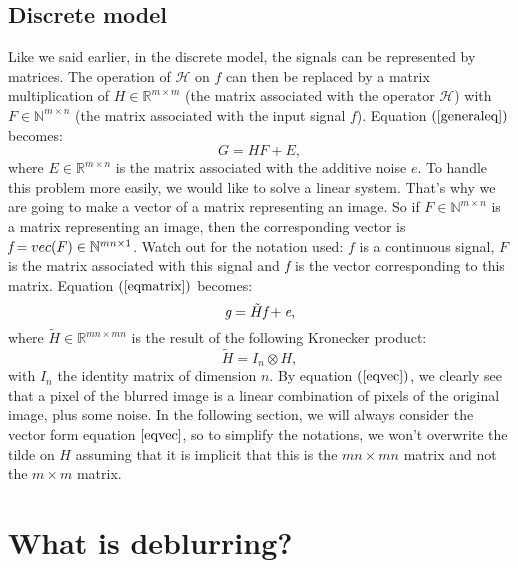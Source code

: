\subsection{Discrete model}

Like we said earlier, in the discrete model, the signals can be represented by matrices. The operation of $\mathcal{H}$ on $f$ can then be replaced by a matrix multiplication of $H \in \mathbb{R}^{m \times m}$ (the matrix associated with the operator $\mathcal{H}$) with $F \in \mathbb{N}^{m \times n}$ (the matrix associated with the input signal $f$). Equation $(\ref{generaleq})$ becomes:
\begin{equation}
G = HF + E,
\label{eqmatrix}
\end{equation}
where $E \in \mathbb{R}^{m \times n}$ is the matrix associated with the additive noise $e$. To handle this problem more easily, we would like to solve a linear system. That's why we are going to make a vector of a matrix representing an image. So if $F \in \mathbb{N}^{m \times n}$ is a matrix representing an image, then the corresponding vector is $\emph{f} = vec(F) \in \mathbb{N}^{mn \times 1}$. Watch out for the notation used: $f$ is a continuous signal, $F$ is the matrix associated with this signal and $\emph{f}$  is the vector corresponding to this matrix. Equation $(\ref{eqmatrix})$ becomes:
\begin{equation}
\emph{g} = \tilde{H}\emph{f} + \emph{e},
\label{eqvec}
\end{equation}
where $\tilde{H} \in \mathbb{R}^{mn \times mn}$ is the result of the following Kronecker product:
\begin{equation}
\tilde{H} = I_n \otimes H,
\end{equation}
with $I_n$ the identity matrix of dimension $n$. By equation $(\ref{eqvec})$, we clearly see that a pixel of the blurred image is a linear combination of pixels of the original image, plus some noise. In the following section, we will always consider the vector form equation $\ref{eqvec}$, so to simplify the notations, we won't overwrite the tilde on $H$ assuming that it is implicit that this is the $mn \times mn$ matrix and not the $m \times m$ matrix.


\section{What is deblurring?} %


